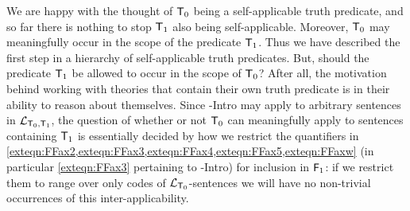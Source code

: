 \documentclass[UKenglish,cleveref,DIV=12]{scrartcl}
\theoremstyle{definition}
\theoremstyle{definition}
\begin{document}
We are happy with the thought of $\mathsf{T}_0$ being a self-applicable truth predicate,
and so far there is nothing to stop $\mathsf{T}_1$ also being self-applicable. Moreover, $\mathsf{T}_0$
may meaningfully occur in the scope of the predicate $\mathsf{T}_1$. Thus we have described the
first step in a hierarchy of self-applicable truth predicates. But, should the
predicate $\mathsf{T}_1$ be allowed to occur in the scope of $\mathsf{T}_0$? After all, the
motivation behind working with theories that contain their own truth predicate
is in their ability to reason about themselves.
Since
-Intro may apply to arbitrary sentences in $\mathcal{L}_{\mathsf{T}_0,\mathsf{T}_1}$, the question
of whether or not $\mathsf{T}_0$ can meaningfully apply to sentences containing $\mathsf{T}_1$
is essentially decided by how we restrict the quantifiers in
\cref{exteqn:FFax2,exteqn:FFax3,exteqn:FFax4,exteqn:FFax5,exteqn:FFaxw} (in
particular \cref{exteqn:FFax3} pertaining to -Intro) for inclusion in
$\mathsf{F}_1$: if we restrict them to range over only codes of $\mathcal{L}_{\mathsf{T}_0}$-sentences we
will have no non-trivial occurrences of this inter-applicability.
\end{document}
